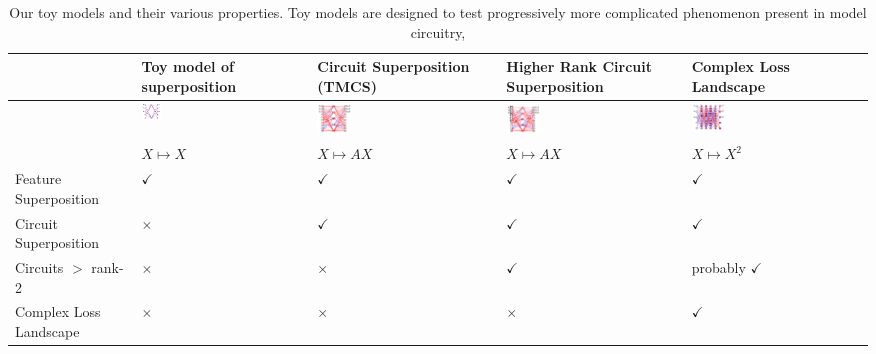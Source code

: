 \documentclass{article}
\theoremstyle{plain}
\theoremstyle{definition}
\theoremstyle{remark}
\begin{document}
\begin{table}[htb]
    \centering
    \begin{tabularx}{\textwidth}{X X X X X}  %
        \toprule
         & Toy model of superposition & Circuit Superposition (TMCS) & Higher Rank Circuit Superposition & Complex Loss Landscape \\  
        \midrule

        \hline
        & \includegraphics[width=0.12\textwidth]{../figures/2a_toy_models_setup.pdf} &
        \includegraphics[width=0.2\textwidth]{../figures/2b_toy_models_setup.pdf} &
        \includegraphics[width=0.2\textwidth]{../figures/2c_toy_models_setup.pdf} &
        \includegraphics[width=0.2\textwidth]{../figures/2d_toy_models_setup.pdf} \\
         & $X \mapsto X$ & $X \mapsto A X$ & $X \mapsto A X$ & $X \mapsto X^2$ \\  
        Feature Superposition & $\checkmark$ & $\checkmark$ & $\checkmark$ & $\checkmark$ \\  
        Circuit Superposition & $\times$ & $\checkmark$ & $\checkmark$ & $\checkmark$ \\  
        Circuits $>$ rank-2 & $\times$ & $\times$ & $\checkmark$ & probably $\checkmark$ \\  
        Complex Loss Landscape & $\times$ & $\times$ & $\times$ & $\checkmark$ \\  
        \bottomrule
    \end{tabularx}
    \caption{Our toy models and their various properties. Toy models are designed to test progressively more complicated phenomenon present in model circuitry,}
    \label{tab:toy_models}
\end{table}
\end{document}
